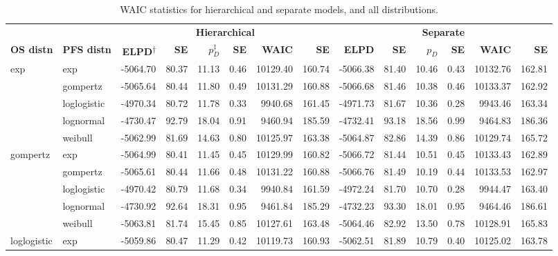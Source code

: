 \documentclass[AMA,STIX1COL]{WileyNJD-v2}
\begin{document}
\begin{center}
\begin{table}[!ht]
\caption{WAIC statistics for hierarchical and separate models, and all distributions. \label{tab:waic}}
\begin{tabular}{llrrrrrrrrrrrr}
\toprule
\multicolumn{1}{l}{} & \multicolumn{1}{l}{} & \multicolumn{6}{c}{\textbf{Hierarchical}} & \multicolumn{6}{c}{\textbf{Separate}}\\
\cmidrule{3-8}\cmidrule{5-6}\cmidrule{9-14}
\textbf{OS distn} & \textbf{PFS distn} & \textbf{ELPD\textsuperscript{$\dagger$}} & \textbf{SE} & \textbf{$p_D^{\ddagger}$} & \textbf{SE} & \textbf{WAIC} & \textbf{SE} & \textbf{ELPD} & \textbf{SE} & $p_D$ & \textbf{SE} & \textbf{WAIC} & \textbf{SE}\\
\midrule
exp & exp & -5064.70 & 80.37 & 11.13 & 0.46 & 10129.40 & 160.74 & -5066.38 & 81.40 & 10.46 & 0.43 & 10132.76 & 162.81\\
 & gompertz & -5065.64 & 80.44 & 11.80 & 0.49 & 10131.29 & 160.88 & -5066.68 & 81.46 & 10.38 & 0.46 & 10133.37 & 162.92\\
 & loglogistic & -4970.34 & 80.72 & 11.78 & 0.33 & 9940.68 & 161.45 & -4971.73 & 81.67 & 10.36 & 0.28 & 9943.46 & 163.34\\
 & lognormal & -4730.47 & 92.79 & 18.04 & 0.91 & 9460.94 & 185.59 & -4732.41 & 93.18 & 18.56 & 0.99 & 9464.83 & 186.36\\
 & weibull & -5062.99 & 81.69 & 14.63 & 0.80 & 10125.97 & 163.38 & -5064.87 & 82.86 & 14.39 & 0.86 & 10129.74 & 165.72\\
gompertz & exp & -5064.99 & 80.41 & 11.45 & 0.45 & 10129.99 & 160.82 & -5066.72 & 81.44 & 10.51 & 0.45 & 10133.43 & 162.89\\
 & gompertz & -5065.61 & 80.44 & 11.66 & 0.48 & 10131.22 & 160.88 & -5066.76 & 81.49 & 10.19 & 0.44 & 10133.53 & 162.97\\
 & loglogistic & -4970.42 & 80.79 & 11.68 & 0.34 & 9940.84 & 161.59 & -4972.24 & 81.70 & 10.70 & 0.28 & 9944.47 & 163.40\\
 & lognormal & -4730.92 & 92.64 & 18.31 & 0.95 & 9461.84 & 185.29 & -4732.23 & 93.30 & 18.01 & 0.95 & 9464.46 & 186.61\\
 & weibull & -5063.81 & 81.74 & 15.45 & 0.85 & 10127.61 & 163.48 & -5064.46 & 82.92 & 13.50 & 0.78 & 10128.91 & 165.83\\
loglogistic & exp & -5059.86 & 80.47 & 11.29 & 0.42 & 10119.73 & 160.93 & -5062.51 & 81.89 & 10.79 & 0.40 & 10125.02 & 163.78\\

\end{tabular}
\end{table}
\end{center}
\end{document}
